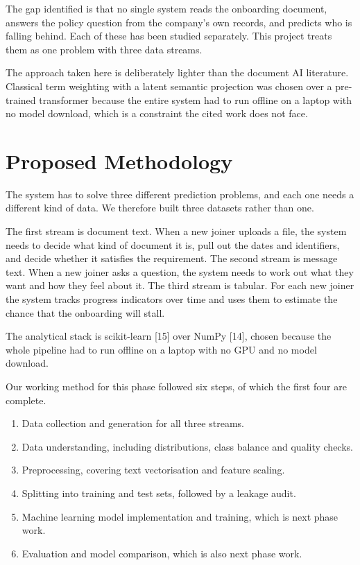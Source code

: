 \documentclass[conference]{IEEEtran}
\begin{document}
The gap identified is that no single system reads the onboarding document, answers the policy question from the company's own records, and predicts who is falling behind. Each of these has been studied separately. This project treats them as one problem with three data streams.

The approach taken here is deliberately lighter than the document AI literature. Classical term weighting with a latent semantic projection was chosen over a pre-trained transformer because the entire system had to run offline on a laptop with no model download, which is a constraint the cited work does not face.

\section{Proposed Methodology}
The system has to solve three different prediction problems, and each one needs a different kind of data. We therefore built three datasets rather than one.

The first stream is document text. When a new joiner uploads a file, the system needs to decide what kind of document it is, pull out the dates and identifiers, and decide whether it satisfies the requirement. The second stream is message text. When a new joiner asks a question, the system needs to work out what they want and how they feel about it. The third stream is tabular. For each new joiner the system tracks progress indicators over time and uses them to estimate the chance that the onboarding will stall.

The analytical stack is scikit-learn [15] over NumPy [14], chosen because the whole pipeline had to run offline on a laptop with no GPU and no model download.

Our working method for this phase followed six steps, of which the first four are complete.

\begin{enumerate}[leftmargin=*,itemsep=2pt]
  \item Data collection and generation for all three streams.
  \item Data understanding, including distributions, class balance and quality checks.
  \item Preprocessing, covering text vectorisation and feature scaling.
  \item Splitting into training and test sets, followed by a leakage audit.
  \item Machine learning model implementation and training, which is next phase work.
  \item Evaluation and model comparison, which is also next phase work.
\end{enumerate}
\end{document}
